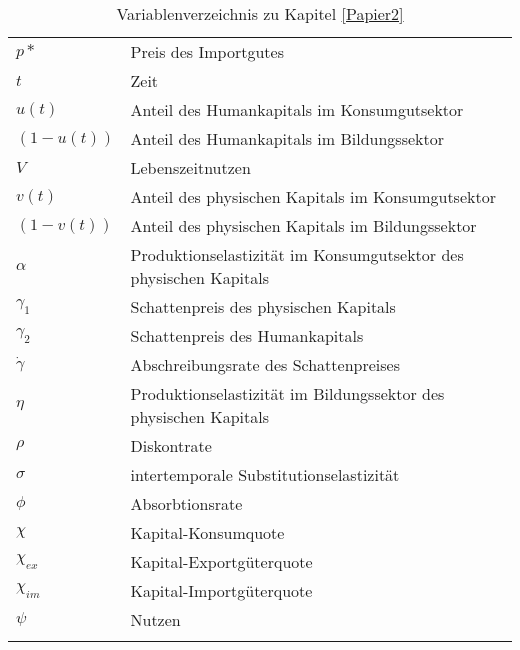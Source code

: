 \begin{center}
\begin{longtable}{|l|l|}
		$p*$ & Preis des Importgutes\\%
		$t$ & Zeit\\%
		$u(t)$ & Anteil des Humankapitals im Konsumgutsektor\\%
		$(1-u(t))$ & Anteil des Humankapitals im Bildungssektor\\%
		$V$ & Lebenszeitnutzen\\%
		$v(t)$ & Anteil des physischen Kapitals im Konsumgutsektor\\%
		$(1-v(t))$ & Anteil des physischen Kapitals im Bildungssektor\\%
		$\alpha$ & Produktionselastizität im Konsumgutsektor des physischen Kapitals\\%
		$\gamma_{1}$ & Schattenpreis des physischen Kapitals\\%
		$\gamma_{2}$ & Schattenpreis des Humankapitals\\%
		$\dot{\gamma}$ & Abschreibungsrate des Schattenpreises\\%
		$\eta$ & Produktionselastizität im Bildungssektor des physischen Kapitals\\%
		$\rho$ & Diskontrate\\%
		$\sigma$ & intertemporale Substitutionselastizität\\%
		$\phi$ & Absorbtionsrate\\%
		$\chi$ & Kapital-Konsumquote\\%
		$\chi_{ex}$ & Kapital-Exportgüterquote\\%
		$\chi_{im}$ & Kapital-Importgüterquote\\%
		$\psi$ & Nutzen \\\hline

\caption{Variablenverzeichnis zu Kapitel \ref{Papier2}}
\end{longtable}
\end{center}